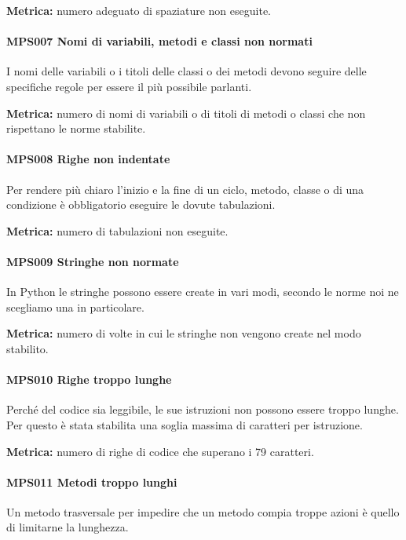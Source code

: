         \textbf{Metrica:} numero adeguato di spaziature non eseguite.
        
        \paragraph{MPS007 Nomi di variabili, metodi e classi non normati}
        I nomi delle variabili o i titoli delle classi o dei metodi devono seguire delle specifiche regole per essere il più possibile parlanti.
        
        \textbf{Metrica:} numero di nomi di variabili o di titoli di metodi o classi che non rispettano le norme stabilite.
        
        \paragraph{MPS008 Righe non indentate}
        Per rendere più chiaro l'inizio e la fine di un ciclo, metodo, classe
        o di una condizione è obbligatorio eseguire le dovute tabulazioni.
        
        \textbf{Metrica:} numero di tabulazioni non eseguite.
        
        \paragraph{MPS009 Stringhe non normate}
        In Python le stringhe possono essere create in vari modi, secondo le norme noi ne scegliamo una in particolare.
        
        \textbf{Metrica:} numero di volte in cui le stringhe non vengono create nel modo stabilito.
        
        \paragraph{MPS010 Righe troppo lunghe}
        Perché del codice sia leggibile, le sue istruzioni non possono essere troppo lunghe. Per questo è stata stabilita una soglia massima di caratteri per istruzione.
        
        \textbf{Metrica:} numero di righe di codice che superano i 79 caratteri.
        
        \paragraph{MPS011 Metodi troppo lunghi}
        Un metodo trasversale per impedire che un metodo compia troppe azioni è quello di limitarne la lunghezza.
        
